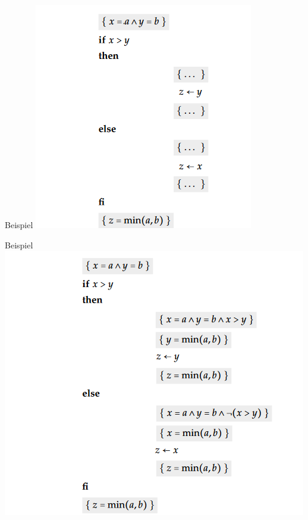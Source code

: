 \documentclass[handout]{beamer}
\begin{document}
\begin{frame}{Beispiel}
	\includegraphics[scale=0.6]{images/if_fi.PNG}
\end{frame}		

\begin{frame}{Beispiel}
	\includegraphics[scale=0.6]{images/if_fi_loes.PNG}
\end{frame}		

\end{document}
